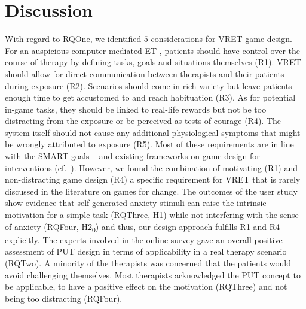 \section{Discussion}
\label{sec:discussion}
With regard to \acl{RQOne}, we identified $5$ considerations for \ac{VRET} game design. 
For an auspicious computer-mediated \ac{ET}%
, patients should have control over the course of therapy by defining tasks, goals and situations themselves (R1). \ac{VRET} should allow for direct communication between therapists and their patients during exposure (R2). Scenarios should come in rich variety but leave patients enough time to get accustomed to and %
reach habituation (R3). As for potential in-game tasks, they should be linked to real-life rewards but not be too distracting from the exposure or be perceived as tests of courage (R4). The system itself should not cause any additional physiological symptoms that might be wrongly attributed to exposure (R5). Most of these requirements are in line with the SMART goals
~\cite{fenn2013} and  existing frameworks on game design for interventions (cf.~\cite{coyle2007, fleming2017,thompson2010}).
However, we found the combination of motivating (R1) and non-distracting game design (R4) a specific requirement for \ac{VRET} that is rarely discussed in the literature on games for change.
The outcomes of the user study show evidence that self-generated anxiety stimuli can raise the intrinsic motivation for a simple task (\acl{RQThree}, H1) while not interfering with the sense of anxiety (\acl{RQFour}, H2\textsubscript{0}) and thus, our design approach fulfills R1 and R4 explicitly.
The experts involved in the online survey gave an overall positive assessment of \ac{PUT} design in terms of applicability in a real therapy scenario (\acl{RQTwo}). A minority of the therapists was concerned that the patients would avoid challenging themselves.
Most therapists acknowledged the \ac{PUT} concept to be applicable, to have a positive effect on the motivation (\acl{RQThree}) and not being too distracting (\acl{RQFour}).
